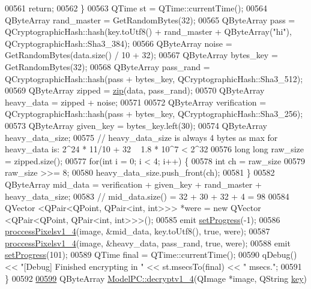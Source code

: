 \begin{DoxyCode}
00561         \textcolor{keywordflow}{return};
00562     \}
00563     QTime st = QTime::currentTime();
00564     QByteArray rand\_master = GetRandomBytes(32);
00565     QByteArray pass = QCryptographicHash::hash(key.toUtf8() + rand\_master + QByteArray(\textcolor{stringliteral}{"hi"}), 
      QCryptographicHash::Sha3\_384);
00566     QByteArray noise = GetRandomBytes(data.size() / 10 + 32);
00567     QByteArray bytes\_key = GetRandomBytes(32);
00568     QByteArray pass\_rand = QCryptographicHash::hash(pass + bytes\_key, QCryptographicHash::Sha3\_512);
00569     QByteArray zipped = \hyperlink{class_model_p_c_afebbbfa4b07deba4f68fc6dfb50f353f}{zip}(data, pass\_rand);
00570     QByteArray heavy\_data = zipped + noise;
00571 
00572     QByteArray verification = QCryptographicHash::hash(pass + bytes\_key, QCryptographicHash::Sha3\_256);
00573     QByteArray given\_key = bytes\_key.left(30);
00574     QByteArray heavy\_data\_size;
00575     \textcolor{comment}{// heavy\_data\_size is always 4 bytes as max for heavy\_data is: 2^24 * 11/10 + 32 ~ 1.8 * 10^7 < 2^32}
00576     \textcolor{keywordtype}{long} \textcolor{keywordtype}{long} raw\_size = zipped.size();
00577     \textcolor{keywordflow}{for}(\textcolor{keywordtype}{int} i = 0; i < 4; i++) \{
00578         \textcolor{keywordtype}{int} ch = raw\_size %
00579         raw\_size >>= 8;
00580         heavy\_data\_size.push\_front(ch);
00581     \}
00582     QByteArray mid\_data = verification + given\_key + rand\_master + heavy\_data\_size;
00583     \textcolor{comment}{// mid\_data.size() = 32 + 30 + 32 + 4 = 98}
00584     QVector <QPair<QPoint, QPair<int, int>>> *were = \textcolor{keyword}{new} QVector <QPair<QPoint, QPair<int, int>>>();
00585     emit \hyperlink{class_model_p_c_afdcd80f0ed5062e145a71f09b0897547}{setProgress}(-1);
00586     \hyperlink{class_model_p_c_a5cdb4d1d61ff62ee9d45b496a7dbf1fb}{proccessPixelsv1\_4}(image, &mid\_data, key.toUtf8(), \textcolor{keyword}{true}, were);
00587     \hyperlink{class_model_p_c_a5cdb4d1d61ff62ee9d45b496a7dbf1fb}{proccessPixelsv1\_4}(image, &heavy\_data, pass\_rand, \textcolor{keyword}{true}, were);
00588     emit \hyperlink{class_model_p_c_afdcd80f0ed5062e145a71f09b0897547}{setProgress}(101);
00589     QTime \textcolor{keyword}{final} = QTime::currentTime();
00590     qDebug() << \textcolor{stringliteral}{"[Debug] Finished encrypting in "} << st.msecsTo(\textcolor{keyword}{final}) << \textcolor{stringliteral}{" msecs."};
00591 \}
00592 
\hypertarget{modelpc_8cpp_source.tex_l00599}{}\hyperlink{class_model_p_c_a7a1f7d491e1bde16936190b9e90896b0}{00599} QByteArray \hyperlink{class_model_p_c_a7a1f7d491e1bde16936190b9e90896b0}{ModelPC::decryptv1\_4}(QImage *image, QString \hyperlink{namespace_errors_dict_setup_a09c268098d09ffb8e5504f30fa6d5dd9}{key})

\end{DoxyCode}
